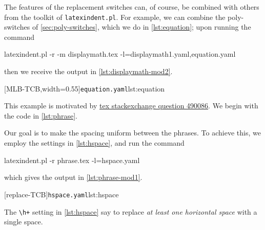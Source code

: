 \documentclass[10pt]{article}
\begin{document}
\begin{example}
 The features of the replacement switches can, of course, be combined with others from
 the toolkit of \texttt{latexindent.pl}. For example, we can combine the poly-switches of
 \vref{sec:poly-switches}, which we do in \cref{lst:equation}; upon running the command
   

 \begin{commandshell}
latexindent.pl -r -m displaymath.tex -l=displaymath1.yaml,equation.yaml
\end{commandshell}

 then we receive the output in \cref{lst:displaymath-mod2}.

 \begin{cmhtcbraster}[
   raster force size=false,
   raster column 1/.style={add to width=-.1\textwidth},
   raster column skip=.06\linewidth]
  [MLB-TCB,width=0.55\textwidth]{\texttt{equation.yaml}}{lst:equation}
 \end{cmhtcbraster}
 \end{example}

 \begin{example}
 This example is motivated by
 \href{https://tex.stackexchange.com/questions/490086/bring-several-lines-together-to-fill-blank-spaces-in-texmaker}{tex
 stackexchange question 490086}. We begin with the code in \cref{lst:phrase}.


 Our goal is to make the spacing uniform between the phrases. To achieve this, we employ
 the settings in \cref{lst:hspace}, and run the command 

 \begin{commandshell}
latexindent.pl -r phrase.tex -l=hspace.yaml
\end{commandshell}

 which gives the output in \cref{lst:phrase-mod1}.  

 \begin{cmhtcbraster}
  [replace-TCB]{\texttt{hspace.yaml}}{lst:hspace}
 \end{cmhtcbraster}

 The \lstinline!\h+! setting in \cref{lst:hspace} say to replace \emph{at least one
 horizontal space} with a single space.
 \end{example}
\end{document}
